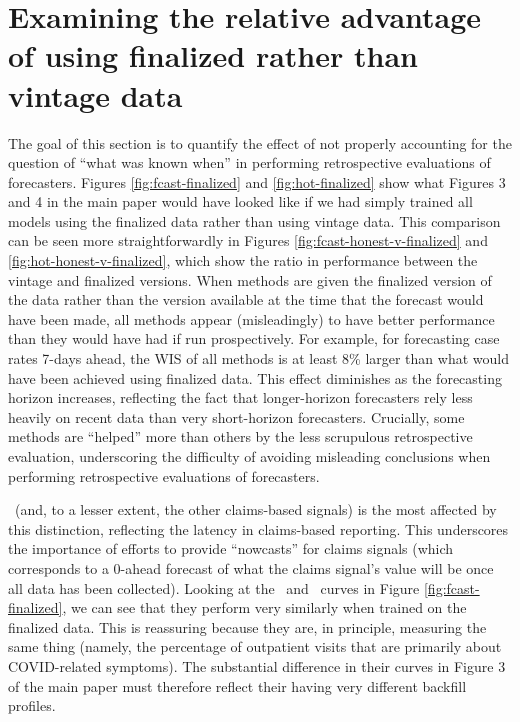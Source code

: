 

\section{Examining the relative advantage of using finalized rather than vintage data}

The goal of this section is to quantify the effect of
not properly accounting for the question of ``what was known when'' in
performing retrospective evaluations of forecasters.   Figures
\ref{fig:fcast-finalized} and \ref{fig:hot-finalized} show 
what Figures 3 and 4 in the main paper would have looked like if we
had simply trained all models using the finalized data rather than
using vintage data.  This comparison can be seen more
straightforwardly in Figures \ref{fig:fcast-honest-v-finalized} and
\ref{fig:hot-honest-v-finalized}, which show the ratio in performance between
the vintage and finalized 
versions.  When methods are 
given the finalized version of the data rather than the version available at the
time that the forecast would have been made, all methods 
appear (misleadingly) to have better performance than they would
have had if run prospectively.  For example, for forecasting case rates
7-days ahead, the WIS of all methods is at least 8\% larger than what would have been
achieved using finalized data.  This effect
diminishes as the forecasting horizon increases, reflecting the fact
that longer-horizon forecasters rely less heavily on recent data than very
short-horizon forecasters.  Crucially, some methods are
``helped'' more than others by the less scrupulous retrospective
evaluation, underscoring the difficulty of avoiding misleading
conclusions when performing retrospective evaluations of forecasters.

\chngcli~(and, to a lesser extent, the other claims-based
signals) is the most  
affected by this distinction, reflecting the latency in claims-based
reporting.  This underscores the importance of efforts to provide ``nowcasts'' for
claims signals 
(which corresponds to a 0-ahead forecast of what the claims
signal's value will be once all data has been collected). Looking at
the \chngcli~and \dv~curves in Figure \ref{fig:fcast-finalized}, we
can see that they perform very similarly when trained on the finalized data.
This is reassuring 
because they are, in principle, measuring the same thing (namely, the percentage of
outpatient visits that are primarily about COVID-related symptoms).
The substantial difference in their curves in Figure 3 of the
main paper must therefore reflect their having very different
backfill profiles.  
  
